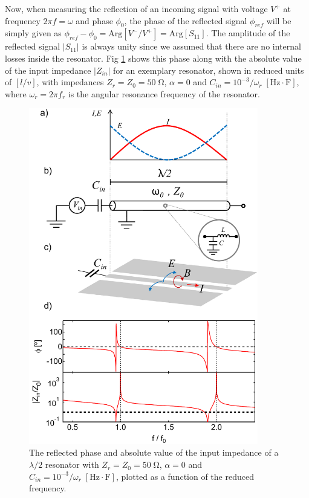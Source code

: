 Now, when measuring the reflection of an incoming signal with voltage $V^+$ at frequency $2\pi f=\omega$ and phase $\phi_0$, the phase of the reflected signal $\phi_{ref}$ will be simply given as $\phi_{ref}-\phi_0=\mathrm{Arg}[V^-/V^+] = \mathrm{Arg}[S_{11}]$. The amplitude of the reflected signal $|S_{11}|$ is always unity since we assumed that there are no internal losses inside the resonator. Fig \ref{fig:lambda_over_4_response} shows this phase along with the absolute value of the input impedance $|Z_{in}|$ for an exemplary resonator, shown in reduced units of $[l/v]$, with impedances $Z_r=Z_0=50\;\mathrm{\Omega}$, $\alpha=0$ and $C_{in}=10^{-3}/\omega_r\;[\mathrm{Hz}\cdot \mathrm{F}]$, where $\omega_r = 2\pi f_r$ is the angular resonance frequency of the resonator.

\begin{figure}
	\includegraphics[width=10cm]{"./material/mathematica/cpw_lambda_over_4_phase_and_z_with_schematic"}
	\caption{The reflected phase and absolute value of the input impedance of a $\lambda/2$ resonator with $Z_r=Z_0=50\;\mathrm{\Omega}$, $\alpha=0$ and $C_{in}=10^{-3}/\omega_r\;[\mathrm{Hz}\cdot\mathrm{F}]$, plotted as a function of the reduced frequency.}
	\label{fig:lambda_over_4_response}
\end{figure}

